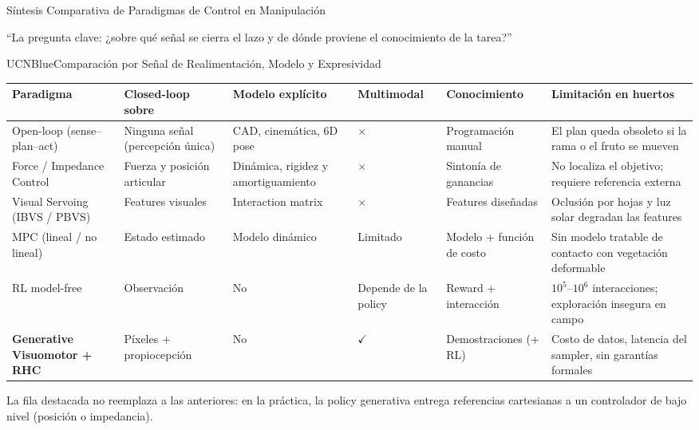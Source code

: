 \documentclass[aspectratio=169,10pt,xcolor={dvipsnames,table}]{beamer}
\newcommand{\BannerFont}{\fontsize{7.5}{9.2}\selectfont\bfseries}       %
\newcommand{\BannerArc}{1.5pt}             %
\newcommand{\BannerRule}{0.5pt}            %
\newcommand{\BannerLeftRule}{2.5pt}        %
\newcommand{\CardHeightTall}{46mm}         %
\newcommand{\BannerCentral}[2][UCNCyan]{%
  \begin{tcolorbox}[
    enhanced,
    colback=#1!10,
    colframe=#1,
    boxrule=\BannerRule,
    leftrule=\BannerLeftRule,
    arc=\BannerArc,
    top=0.35mm, bottom=0.35mm, left=2mm, right=2mm
  ]
    {\BannerFont\raggedright\textcolor{UCNBlue}{#2}\par}
  \end{tcolorbox}%
  \vspace{-2.5mm}%
}
\newcommand{\CheckMark}{\textcolor{AgriGreen}{$\checkmark$}}
\newcommand{\CrossMark}{\textcolor{AlertRed}{$\times$}}
\newcommand{\TabFont}{\fontsize{5.3}{6.4}\selectfont}                    %
\begin{document}
\begin{frame}{Síntesis Comparativa de Paradigmas de Control en Manipulación}
  \BannerCentral[UCNBlue]{``La pregunta clave: ¿sobre qué señal se cierra el lazo y de dónde proviene el conocimiento de la tarea?''}
  \vspace{0.8mm}
  \begin{Card}[height=\CardHeightTall]{UCNBlue}{Comparación por Señal de Realimentación, Modelo y Expresividad}
    {\TabFont
    \setlength{\tabcolsep}{2pt}
    \renewcommand{\arraystretch}{1.0}
    \begin{tabular}{@{}>{\raggedright\arraybackslash}p{25mm} >{\raggedright\arraybackslash}p{22mm} >{\raggedright\arraybackslash}p{23mm} >{\centering\arraybackslash}p{12mm} >{\raggedright\arraybackslash}p{23mm} >{\raggedright\arraybackslash}p{34mm}@{}}
      \toprule
      \textbf{Paradigma} & \textbf{Closed-loop sobre} & \textbf{Modelo explícito} & \textbf{Multimodal} & \textbf{Conocimiento} & \textbf{Limitación en huertos} \\
      \midrule
      Open-loop (sense--plan--act) & Ninguna señal (percepción única) & CAD, cinemática, 6D pose & \CrossMark & Programación manual & El plan queda obsoleto si la rama o el fruto se mueven \\
      Force / Impedance Control & Fuerza y posición articular & Dinámica, rigidez y amortiguamiento & \CrossMark & Sintonía de ganancias & No localiza el objetivo; requiere referencia externa \\
      Visual Servoing (IBVS / PBVS) & Features visuales & Interaction matrix & \CrossMark & Features diseñadas & Oclusión por hojas y luz solar degradan las features \\
      MPC (lineal / no lineal) & Estado estimado & Modelo dinámico & Limitado & Modelo + función de costo & Sin modelo tratable de contacto con vegetación deformable \\
      RL model-free & Observación & No & Depende de la policy & Reward + interacción & $10^{5}$--$10^{6}$ interacciones; exploración insegura en campo \\
      \rowcolor{AgriGreenLight} \textbf{Generative Visuomotor + RHC} & Píxeles + propiocepción & No & \CheckMark & Demostraciones (+ RL) & Costo de datos, latencia del sampler, sin garantías formales \\
      \bottomrule
    \end{tabular}\par
    \vspace{1mm}
    \textcolor{TextDark!80}{La fila destacada no reemplaza a las anteriores: en la práctica, la policy generativa entrega referencias cartesianas a un controlador de bajo nivel (posición o impedancia).}}
  \end{Card}
\end{frame}
\end{document}

